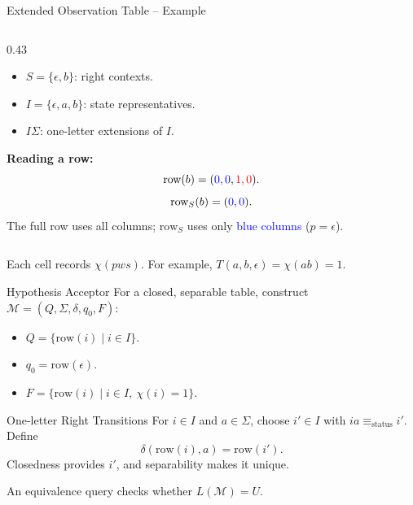 \documentclass{beamer}
\begin{document}
\begin{frame}{Extended Observation Table -- Example}
\begin{columns}[T,onlytextwidth]
\begin{column}{0.43\textwidth}
\begin{itemize}
                \item $S=\{\epsilon,b\}$: right contexts.
                \item $I=\{\epsilon,a,b\}$: state representatives.
                \item $I\Sigma$: one-letter extensions of $I$.
            \end{itemize}
            \textbf{Reading a row:}
            $$
            \text{row}(b)=(\textcolor{blue}{0,0},\textcolor{red}{1,0}).
            $$
            $$
            \text{row}_S(b)=(\textcolor{blue}{0,0}).
            $$
            The full row uses all columns; $\text{row}_S$ uses only
            \textcolor{blue}{blue columns} ($p=\epsilon$).
        \end{column}
    \end{columns}
    \vspace{0.5em}
    {\small Each cell records $\chi(pws)$.
    For example, $T(a,b,\epsilon)=\chi(ab)=1$.}
\end{frame}

\begin{frame}{Hypothesis Acceptor}
    For a closed, separable table, construct
    $\mathcal{M}=(Q,\Sigma,\delta,q_0,F)$:
    \begin{itemize}
        \item $Q=\{\text{row}(i)\mid i\in I\}$.
        \item $q_0=\text{row}(\epsilon)$.
        \item $F=\{\text{row}(i)\mid i\in I,\ \chi(i)=1\}$.
    \end{itemize}
    \begin{block}{One-letter Right Transitions}
        For $i\in I$ and $a\in\Sigma$, choose $i'\in I$ with
        $ia\equiv_{\mathrm{status}}i'$. Define
        $$
        \delta(\text{row}(i),a)=\text{row}(i').
        $$
        Closedness provides $i'$, and separability makes it unique.
    \end{block}
    An equivalence query checks whether $L(\mathcal{M})=U$.
\end{frame}
\end{document}
